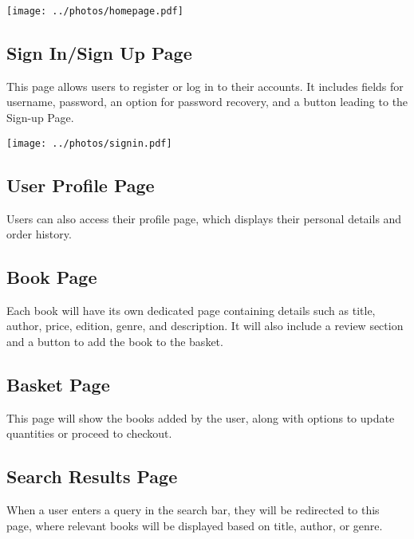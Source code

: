 \texttt{[image: ../photos/homepage.pdf]}


\subsection{Sign In/Sign Up Page} \label{sec:signin}
This page allows users to register or log in to their accounts. It includes fields for username, password, an option for password recovery, and a button leading to the Sign-up Page.

\texttt{[image: ../photos/signin.pdf]}

\subsection{User Profile Page} \label{sec:profile}
Users can also access their profile page, which displays their personal details and order history.

\subsection{Book Page} \label{sec:book}
Each book will have its own dedicated page containing details such as title, author, price, edition, genre, and description. It will also include a review section and a button to add the book to the basket.

\subsection{Basket Page} \label{sec:basket}
This page will show the books added by the user, along with options to update quantities or proceed to checkout.

\subsection{Search Results Page} \label{sec:search}
When a user enters a query in the search bar, they will be redirected to this page, where relevant books will be displayed based on title, author, or genre.